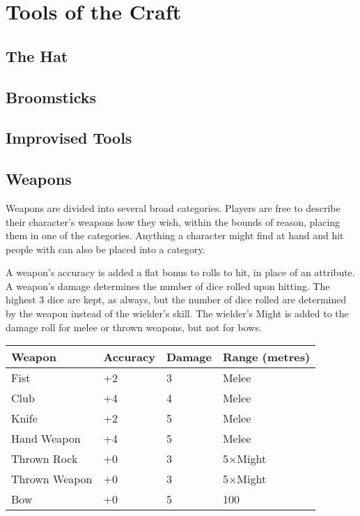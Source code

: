 \chapter{Tools of the Craft}

\section{The Hat}

\section{Broomsticks}

\section{Improvised Tools}

\section{Weapons}

Weapons are divided into several broad categories.
Players are free to describe their character's weapons how they wish, within the bounds of reason, placing them in one of the categories.
Anything a character might find at hand and hit people with can also be placed into a category.

A weapon's accuracy is added a flat bonus to rolls to hit, in place of an attribute.
A weapon's damage determines the number of dice rolled upon hitting.
The highest 3 dice are kept, as always, but the number of dice rolled are determined by the weapon instead of the wielder's skill.
The wielder's Might is added to the damage roll for melee or thrown weapons, but not for bows.

\begin{center}
	\begin{tabu}{X[2.4]XXX[1.2]}
		\toprule
		Weapon & Accuracy & Damage & Range (metres)\\
		\midrule
		Fist & +2 & 3 & Melee\\
		Club & +4 & 4 & Melee\\
		Knife & +2 & 5 & Melee\\
		Hand Weapon & +4 & 5 & Melee\\
		Thrown Rock & +0 & 3 & 5$\times$Might\\
		Thrown Weapon & +0 & 3 & 5$\times$Might\\
		Bow & +0 & 5 & 100\\
		\bottomrule
	\end{tabu}
\end{center}

